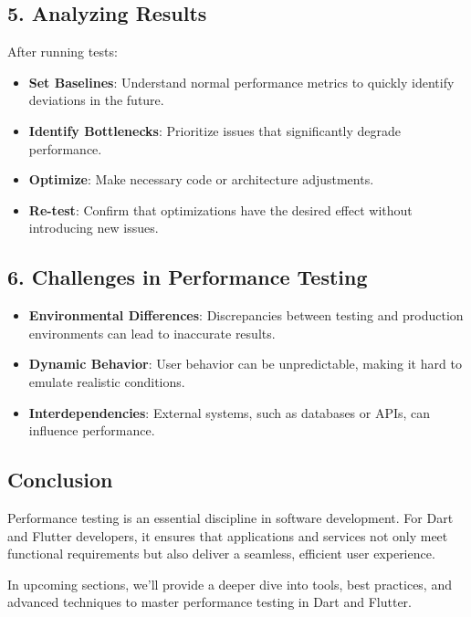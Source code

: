 \documentclass[
]{article}
\providecommand{\tightlist}{%
  \setlength{\itemsep}{0pt}\setlength{\parskip}{0pt}}
\begin{document}
\subsection{5. Analyzing Results}\label{analyzing-results}

After running tests:

\begin{itemize}
\tightlist
\item
  \textbf{Set Baselines}: Understand normal performance metrics to
  quickly identify deviations in the future.
\item
  \textbf{Identify Bottlenecks}: Prioritize issues that significantly
  degrade performance.
\item
  \textbf{Optimize}: Make necessary code or architecture adjustments.
\item
  \textbf{Re-test}: Confirm that optimizations have the desired effect
  without introducing new issues.
\end{itemize}

\subsection{6. Challenges in Performance
Testing}\label{challenges-in-performance-testing}

\begin{itemize}
\tightlist
\item
  \textbf{Environmental Differences}: Discrepancies between testing and
  production environments can lead to inaccurate results.
\item
  \textbf{Dynamic Behavior}: User behavior can be unpredictable, making
  it hard to emulate realistic conditions.
\item
  \textbf{Interdependencies}: External systems, such as databases or
  APIs, can influence performance.
\end{itemize}

\subsection{Conclusion}\label{conclusion-16}

Performance testing is an essential discipline in software development.
For Dart and Flutter developers, it ensures that applications and
services not only meet functional requirements but also deliver a
seamless, efficient user experience.

In upcoming sections, we'll provide a deeper dive into tools, best
practices, and advanced techniques to master performance testing in Dart
and Flutter.
\end{document}
